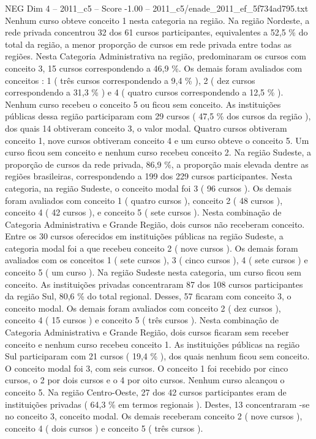 \begin{textsample}{NEG Dim 4 – 2011\_c5 – Score -1.00 – 2011\_c5/enade\_2011\_ef\_5f734ad795.txt}
Nenhum curso obteve conceito 1 nesta categoria na região.
Na região Nordeste, a rede privada concentrou 32 dos 61 cursos participantes, equivalentes a 52,5 \% do total da região, a menor proporção de cursos em rede privada entre todas as regiões.
Nesta Categoria Administrativa na região, predominaram os cursos com conceito 3, 15 cursos correspondendo a 46,9 \%.
Os demais foram avaliados com conceitos : 1 ( três cursos correspondendo a 9,4 \% ), 2 ( dez cursos correspondendo a 31,3 \% ) e 4 ( quatro cursos correspondendo a 12,5 \% ).
Nenhum curso recebeu o conceito 5 ou ficou sem conceito.
As instituições públicas dessa região participaram com 29 cursos ( 47,5 \% dos cursos da região ), dos quais 14 obtiveram conceito 3, o valor modal.
Quatro cursos obtiveram conceito 1, nove cursos obtiveram conceito 4 e um curso obteve o conceito 5.
Um curso ficou sem conceito e nenhum curso recebeu conceito 2.
Na região Sudeste, a proporção de cursos da rede privada, 86,9 \%, a proporção mais elevada dentre as regiões brasileiras, correspondendo a 199 dos 229 cursos participantes.
Nesta categoria, na região Sudeste, o conceito modal foi 3 ( 96 cursos ).
Os demais foram avaliados com conceito 1 ( quatro cursos ), conceito 2 ( 48 cursos ), conceito 4 ( 42 cursos ), e conceito 5 ( sete cursos ).
Nesta combinação de Categoria Administrativa e Grande Região, dois cursos não receberam conceito.
Entre os 30 cursos oferecidos em instituições públicas na região Sudeste, a categoria modal foi a que recebeu conceito 2 ( nove cursos ).
Os demais foram avaliados com os conceitos 1 ( sete cursos ), 3 ( cinco cursos ), 4 ( sete cursos ) e conceito 5 ( um curso ).
Na região Sudeste nesta categoria, um curso ficou sem conceito.
As instituições privadas concentraram 87 dos 108 cursos participantes da região Sul, 80,6 \% do total regional.
Desses, 57 ficaram com conceito 3, o conceito modal.
Os demais foram avaliados com conceito 2 ( dez cursos ), conceito 4 ( 15 cursos ) e conceito 5 ( três cursos ).
Nesta combinação de Categoria Administrativa e Grande Região, dois cursos ficaram sem receber conceito e nenhum curso recebeu conceito 1.
As instituições públicas na região Sul participaram com 21 cursos ( 19,4 \% ), dos quais nenhum ficou sem conceito.
O conceito modal foi 3, com seis cursos.
O conceito 1 foi recebido por cinco cursos, o 2 por dois cursos e o 4 por oito cursos.
Nenhum curso alcançou o conceito 5.
Na região Centro-Oeste, 27 dos 42 cursos participantes eram de instituições privadas ( 64,3 \% em termos regionais ).
Destes, 13 concentraram -se no conceito 3, conceito modal.
Os demais receberam conceito 2 ( nove cursos ), conceito 4 ( dois cursos ) e conceito 5 ( três cursos ).

\end{textsample}
